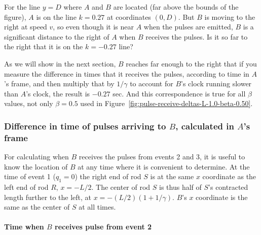 \documentclass[a4paper]{article}
\theoremstyle{plain}
\theoremstyle{definition}
\begin{document}
For the line $y=D$ where $A$ and $B$ are located (far above the bounds
of the figure), $A$ is on the line $k=0.27$ at coordinates $(0, D)$.
But $B$ is moving to the right at speed $v$, so even though it is near
$A$ when the pulses are emitted, $B$ is a significant distance to the
right of $A$ when $B$ receives the pulses.  Is it so far to the right
that it is on the $k=-0.27$ line?

As we will show in the next section, $B$ reaches far enough to the
right that if you measure the difference in times that it receives the
pulses, according to time in $A$'s frame, and then multiply that by
$1/\gamma$ to account for $B$'s clock running slower than $A$'s clock,
the result is $-0.27$ sec.  And this correspondence is true for all
$\beta$ values, not only $\beta=0.5$ used in
Figure~\ref{fig:pulse-receive-deltas-L-1.0-beta-0.50}.


\subsubsection{Difference in time of pulses arriving to $B$, calculated in $A$'s frame}
\label{sec:scen2a-Breceivepulsetimes}


For calculating when $B$ receives the pulses from events 2 and 3, it
is useful to know the location of $B$ at any time where it is
convenient to determine.  At the time of event 1 ($q_1=0$) the right
end of rod $S$ is at the same $x$ coordinate as the left end of rod
$R$, $x=-L/2$.  The center of rod $S$ is thus half of $S$'s contracted
length further to the left, at $x=-(L/2)(1+1/\gamma)$.  $B$'s $x$
coordinate is the same as the center of $S$ at all times.

\paragraph{Time when $B$ receives pulse from event 2}
\end{document}
